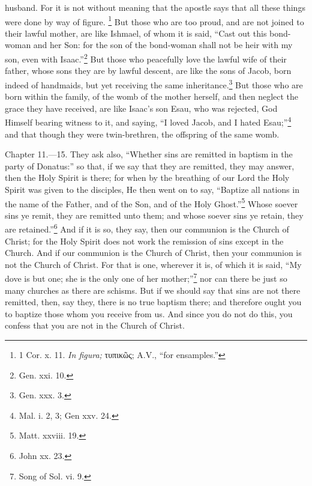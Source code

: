 husband. For it is not without meaning that the apostle says that all these things were done by way of figure. \footnote{\par  1 Cor. x. 11. \emph{In figura;} \textgreek{τυπικῶς}; A.V., ``for ensamples.''} But those who are too proud, and are not joined to their lawful mother, are like Ishmael, of whom it is said, ``Cast out this bond-woman and her Son: for the son of the bond-woman shall not be heir with my son, even with Isaac.''\footnote{\par  Gen. xxi. 10.} But those who peacefully love the lawful wife of their father, whose sons they are by lawful descent, are like the sons of Jacob, born indeed of handmaids, but yet receiving the same inheritance.\footnote{\par  Gen. xxx. 3.} But those who are born within the family, of the womb of the mother herself, and then neglect the grace they have received, are like Isaac’s son Esau, who was rejected, God Himself bearing witness to it, and saying, ``I loved Jacob, and I hated Esau;''\footnote{\par  Mal. i. 2, 3; Gen xxv. 24.} and that though they were twin-brethren, the offspring of the same womb.


Chapter 11.—15. They ask also, ``Whether sins are remitted in baptism in the party of Donatus:'' so that, if we say that they are remitted, they may answer, then the Holy Spirit is there; for when by the breathing of our Lord the Holy Spirit was given to the disciples, He then went on to say, ``Baptize all nations in the name of the Father, and of the Son, and of the Holy Ghost.''\footnote{\par  Matt. xxviii. 19.} Whose soever sins ye remit, they are remitted unto them; and whose soever sins ye retain, they are retained.''\footnote{\par  John xx. 23.} And if it is so, they say, then our communion is the Church of Christ; for the Holy Spirit does not work the remission of sins except in the Church. And if our communion is the Church of Christ, then your communion is not the Church of Christ. For that is one, wherever it is, of which it is said, ``My dove is but one; she is the only one of her mother;''\footnote{\par  Song of Sol. vi. 9.} nor can there be just so many churches as there are schisms. But if we should say that sins are not there remitted, then, say they, there is no true baptism there; and therefore ought you to baptize those whom you receive from us. And since you do not do this, you confess that you are not in the Church of Christ.

